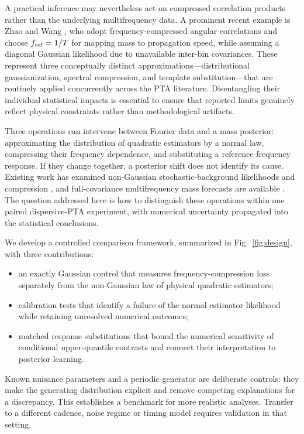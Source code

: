 \documentclass[11pt,a4paper]{article}
\begin{document}
A practical inference may nevertheless act on compressed correlation products rather than the underlying multifrequency data. A prominent recent example is Zhao and Wang \cite{zhao2026}, who adopt frequency-compressed angular correlations and choose $f_{\rm ref}=1/T$ for mapping mass to propagation speed, while assuming a diagonal Gaussian likelihood due to unavailable inter-bin covariances. These represent three conceptually distinct approximations---distributional gaussianization, spectral compression, and template substitution---that are routinely applied concurrently across the PTA literature. Disentangling their individual statistical impacts is essential to ensure that reported limits genuinely reflect physical constraints rather than methodological artifacts.

Three operations can intervene between Fourier data and a mass posterior: approximating the distribution of quadratic estimators by a normal law, compressing their frequency dependence, and substituting a reference-frequency response. If they change together, a posterior shift does not identify its cause. Existing work has examined non-Gaussian stochastic-background likelihoods and compression \cite{franciolini2025}, and full-covariance multifrequency mass forecasts are available \cite{han2026}. The question addressed here is how to distinguish these operations within one paired dispersive-PTA experiment, with numerical uncertainty propagated into the statistical conclusions.

We develop a controlled comparison framework, summarized in Fig.~\ref{fig:design}, with three contributions:
\begin{itemize}
\item an exactly Gaussian control that measures frequency-compression loss separately from the non-Gaussian law of physical quadratic estimators;
\item calibration tests that identify a failure of the normal estimator likelihood while retaining unresolved numerical outcomes;
\item matched response substitutions that bound the numerical sensitivity of conditional upper-quantile contrasts and connect their interpretation to posterior learning.
\end{itemize}
Known nuisance parameters and a periodic generator are deliberate controls: they make the generating distribution explicit and remove competing explanations for a discrepancy. This establishes a benchmark for more realistic analyses. Transfer to a different cadence, noise regime or timing model requires validation in that setting.
\end{document}
